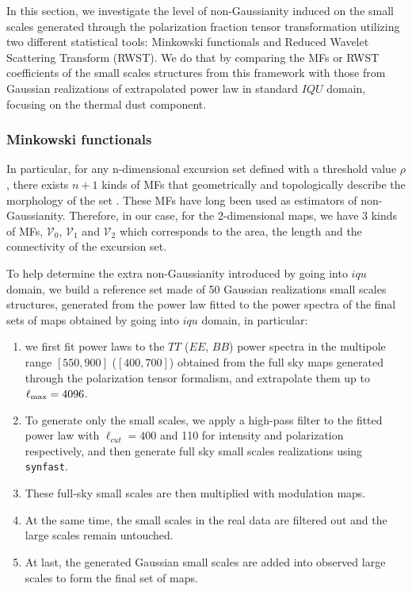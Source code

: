 \documentclass[twocolumn]{aastex631}
\begin{document}
In this section, we investigate the level of non-Gaussianity induced on the small scales generated through the polarization fraction tensor transformation utilizing two different statistical tools: Minkowski functionals and Reduced Wavelet Scattering Transform (RWST). We do that by comparing the MFs or RWST coefficients of the small scales structures from this framework with those from Gaussian realizations of extrapolated power law in standard $IQU$ domain, focusing on the thermal dust component.

\subsubsection{Minkowski functionals}
In particular, for any n-dimensional excursion set defined with a threshold value $\rho$, there exists $n+1$ kinds of MFs that geometrically and topologically describe the morphology of the set \citep{}. These MFs have long been used as estimators of non-Gaussianity. Therefore, in our case, for the 2-dimensional maps, we have 3 kinds of MFs, $\mathcal{V}_0$, $\mathcal{V}_1$ and $\mathcal{V}_2$ which corresponds to the area, the length and the connectivity of the excursion set.

To help determine the extra non-Gaussianity introduced by going into $iqu$ domain, we build a reference set made of 50 Gaussian realizations small scales structures, generated from the power law fitted to the power spectra of the final sets of maps obtained by going into $iqu$ domain, in particular:

\begin{enumerate}

\item we first fit power laws to the $TT$ ($EE$, $BB$) power spectra in the multipole range $[550, 900]$ ($[400, 700]$) obtained from the full sky maps generated through the polarization tensor formalism, and extrapolate them up to $\ell_{\rm max}=4096$. 
\item To generate only the small scales, we apply a high-pass filter to the fitted power law with $\ell_{cut} = 400$ and 110 for intensity and polarization respectively, and then generate full sky small scales realizations using \texttt{synfast}. 
\item These full-sky small scales are then multiplied with modulation maps. 
\item At the same time, the small scales in the real data are filtered out and the large scales remain untouched.
\item At last, the generated Gaussian small scales are added into observed large scales to form the final set of maps. 
\end{enumerate}
\end{document}
